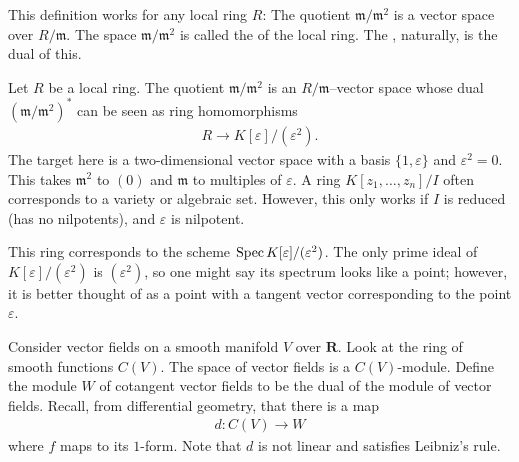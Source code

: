 \documentclass [11 pt, oneside] {article}
\begin{document}
\begin{remark}
	This definition works for any local ring $R$: The quotient $\mathfrak{m}/\mathfrak{m}^2$ is a vector space over $R/\mathfrak{m}$. The space $\mathfrak{m}/\mathfrak{m}^2$ is called the  of the local ring. The , naturally, is the dual of this.
\end{remark}

Let $R$ be a local ring. The quotient $\mathfrak{m}/\mathfrak{m}^2$ is an $R/\mathfrak{m}$--vector space whose dual $(\mathfrak{m}/\mathfrak{m}^2) ^*$ can be seen as ring homomorphisms 
\begin{align*}
	R\longrightarrow K[\varepsilon]/(\varepsilon^2).
\end{align*}
The target here is a two-dimensional vector space with a basis $\{1,\varepsilon\}$ and $\varepsilon^2=0$. This takes $\mathfrak{m}^2$ to $(0)$ and $\mathfrak{m}$ to multiples of $\varepsilon$. A ring $K[z_1,\hdots, z_n]/I$ often corresponds to a variety or algebraic set. However, this only works if $I$ is reduced (has no nilpotents), and $\varepsilon$ is nilpotent. 

This ring corresponds to the scheme $\operatorname{Spec} K[\varepsilon]/(\varepsilon^2)$. The only prime ideal of $K[\varepsilon]/(\varepsilon^2)$ is $(\varepsilon^2)$, so one might say its spectrum looks like a point; however, it is better thought of as a point with a tangent vector corresponding to the point $\varepsilon$.

Consider vector fields on a smooth manifold $V$ over $\mathbf{R}$. Look at the ring of smooth functions $C(V)$. The space of vector fields is a $C(V)$-module. Define the module $W$ of cotangent vector fields to be the dual of the module of vector fields. Recall, from differential geometry, that there is a map
\begin{align*}
	d:C(V) \longrightarrow W
\end{align*}
where $f$ maps to its $1$-form. Note that $d$ is not linear and satisfies Leibniz's rule. 
\end{document}
